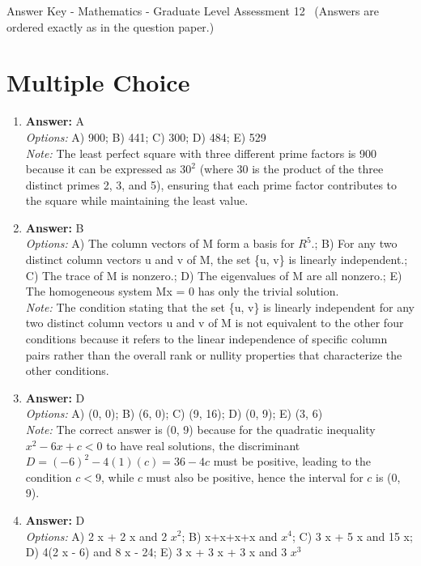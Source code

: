 \documentclass[12pt]{article}
\begin{document}
\begin{center}
Answer Key - Mathematics - Graduate Level Assessment 12 \
\small (Answers are ordered exactly as in the question paper.)
\end{center}

\section*{Multiple Choice}
\begin{enumerate}[label=\arabic*.]
\item \textbf{Answer:} A
\\ \textit{Options:} A) 900; B) 441; C) 300; D) 484; E) 529
\\ \textit{Note:} The least perfect square with three different prime factors is 900 because it can be expressed as \(30^2\) (where 30 is the product of the three distinct primes 2, 3, and 5), ensuring that each prime factor contributes to the square while maintaining the least value.
\item \textbf{Answer:} B
\\ \textit{Options:} A) The column vectors of M form a basis for $R^5$.; B) For any two distinct column vectors u and v of M, the set \{u, v\} is linearly independent.; C) The trace of M is nonzero.; D) The eigenvalues of M are all nonzero.; E) The homogeneous system Mx = 0 has only the trivial solution.
\\ \textit{Note:} The condition stating that the set \{u, v\} is linearly independent for any two distinct column vectors u and v of M is not equivalent to the other four conditions because it refers to the linear independence of specific column pairs rather than the overall rank or nullity properties that characterize the other conditions.
\item \textbf{Answer:} D
\\ \textit{Options:} A) (0, 0); B) (6, 0); C) (9, 16); D) (0, 9); E) (3, 6)
\\ \textit{Note:} The correct answer is (0, 9) because for the quadratic inequality \(x^2 - 6 x + c < 0\) to have real solutions, the discriminant \(D = (-6)^2 - 4(1)(c) = 36 - 4 c\) must be positive, leading to the condition \(c < 9\), while \(c\) must also be positive, hence the interval for \(c\) is (0, 9).
\item \textbf{Answer:} D
\\ \textit{Options:} A) 2 x + 2 x and 2 $x^2$; B) x+x+x+x and $x^4$; C) 3 x + 5 x and 15 x; D) 4(2 x - 6) and 8 x - 24; E) 3 x + 3 x + 3 x and 3 $x^3$

\end{enumerate}
\end{document}
